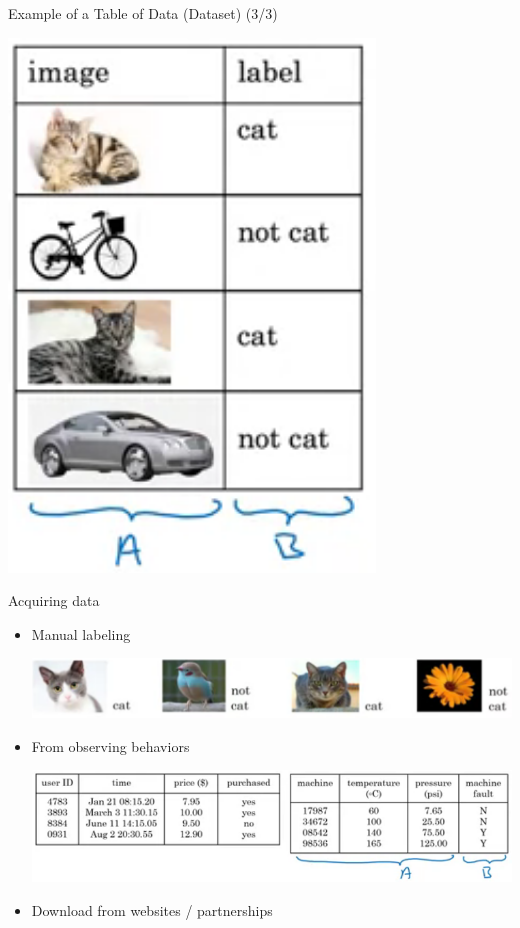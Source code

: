 \documentclass[pdf]{beamer}
\theoremstyle{mystyle}
\begin{document}
\begin{frame}{Example of a Table of Data (Dataset) (3/3)}
	\begin{table}[!ht]
		\centering
		\includegraphics[scale=.3]{example-dataset-3}
		\caption{Cat images dataset~\citep{ng2019AIForEveryone}}
		\label{fig:example-dataset-3}
	\end{table}
\end{frame}

\begin{frame}{Acquiring data}
	\begin{itemize}
		\item<2-> Manual labeling
		\begin{center}
			\includegraphics[scale=.3]{manual-labeling}
		\end{center}
		\item<3-> From observing behaviors
		\begin{center}
			\includegraphics[scale=.35]{observing-behaviors}
		\end{center}
		\item<4-> Download from websites / partnerships		
	\end{itemize}
\end{frame}
\end{document}
